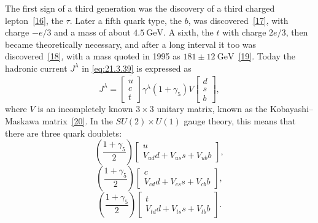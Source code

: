 The first sign of a third generation was the discovery of a third charged lepton~\hyperref[ch21-ref-16]{[16]}, the $\tau$. Later a fifth quark type, the $b$, was discovered~\hyperref[ch21-ref-17]{[17]}, with charge $-e/3$ and a mass of about $4.5\ \mathrm{GeV}$. A sixth, the $t$ with charge $2e/3$, then became theoretically necessary, and after a long interval it too was discovered~\hyperref[ch21-ref-18]{[18]}, with a mass quoted in 1995 as $181\mathbin{\pm}12\ \mathrm{GeV}$~\hyperref[ch21-ref-19]{[19]}. Today the hadronic current $J^\lambda$ in \eqref{eq:21.3.39} is expressed as
\begin{equation}
J^\lambda
=
\overline{\begin{bmatrix}u\\c\\t\end{bmatrix}}
\gamma^\lambda(1+\gamma_5)V
\begin{bmatrix}d\\s\\b\end{bmatrix},
\tag{21.3.45}\label{eq:21.3.45}
\end{equation}
where $V$ is an incompletely known $3\times3$ unitary matrix, known as the Kobayashi--Maskawa matrix~\hyperref[ch21-ref-20]{[20]}. In the $SU(2)\times U(1)$ gauge theory, this means that there are three quark doublets:
\begin{equation}
\left(\frac{1+\gamma_5}{2}\right)
\begin{bmatrix}
u\\
V_{ud}d+V_{us}s+V_{ub}b
\end{bmatrix},
\tag{21.3.46}\label{eq:21.3.46}
\end{equation}
\begin{equation}
\left(\frac{1+\gamma_5}{2}\right)
\begin{bmatrix}
c\\
V_{cd}d+V_{cs}s+V_{cb}b
\end{bmatrix},
\tag{21.3.47}\label{eq:21.3.47}
\end{equation}
\begin{equation}
\left(\frac{1+\gamma_5}{2}\right)
\begin{bmatrix}
t\\
V_{td}d+V_{ts}s+V_{tb}b
\end{bmatrix}.
\tag{21.3.48}\label{eq:21.3.48}
\end{equation}

